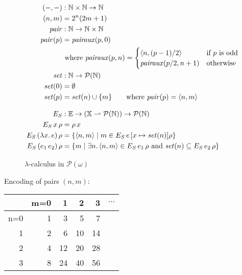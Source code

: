 \documentclass{tufte-handout}
\newcommand{\LAM}[1]{\lambda #1.\,}
\newcommand{\pto}[0]{\rightharpoonup}
\newcommand{\NAT}[0]{\mathbb{N}}
\newcommand{\VAR}[0]{\mathbb{X}}
\begin{document}
\begin{figure}
\begin{align*}
(-,-) &: \NAT \times \NAT \to \NAT \\
  (n,m) &= 2^n(2m+1) \\
\mathit{pair} & : \NAT \to \NAT \times \NAT \\
\mathit{pair}(p) &= \mathit{pairaux}(p, 0)\\
& \text{ where } \mathit{pairaux}(p, n) = 
\begin{cases}
  \langle n, (p - 1) / 2 \rangle & \text{if $p$ is odd} \\
  \mathit{pairaux}(p / 2, n+1) & \text{otherwise}
\end{cases}\\
\mathit{set} & : \NAT \to \mathcal{P}(\NAT)\\
\mathit{set}(0) &= \emptyset \\
\mathit{set}(p) &= \mathit{set}(n) \cup \{m\} \qquad \text{where }
  \mathit{pair}(p) = \langle n,m \rangle \\[2ex]
\EPo{} & : \mathbb{E} \to (\VAR \pto \mathcal{P}(\NAT)) \to \mathcal{P}(\NAT) \\
\POSEM{x}\rho &= \rho\,x \\  
\POSEM{(\LAM{x}e)}\rho &= \{ \langle n, m \rangle \mid m \in \POSEM{e}[x\mapsto \mathit{set}(n)]\rho \} \\
\POSEM{(e_1\,e_2)}\rho &= \{ m \mid \exists n. \, 
   \langle n,m \rangle \in \POSEM{e_1}\rho
   \text{ and } \mathit{set}(n) \subseteq \POSEM{e_2}\rho \}
\end{align*}
\caption{$\lambda$-calculus in $\mathcal{P}(\omega)$}
\label{fig:p-omega}
\end{figure}


Encoding of pairs $(n,m)$:\\
\begin{tabular}{r|rrrrr} 
    &  m=0  &  1 &  2 &  3 & $\cdots$ \\\hline
n=0 &  1  &  3 &  5 &  7 &  \\
1   &  2  &  6 & 10 & 14 &  \\
2   &  4  & 12 & 20 & 28 &  \\
3   &  8  & 24 & 40 & 56 &  \\
\end{tabular}
\end{document}
